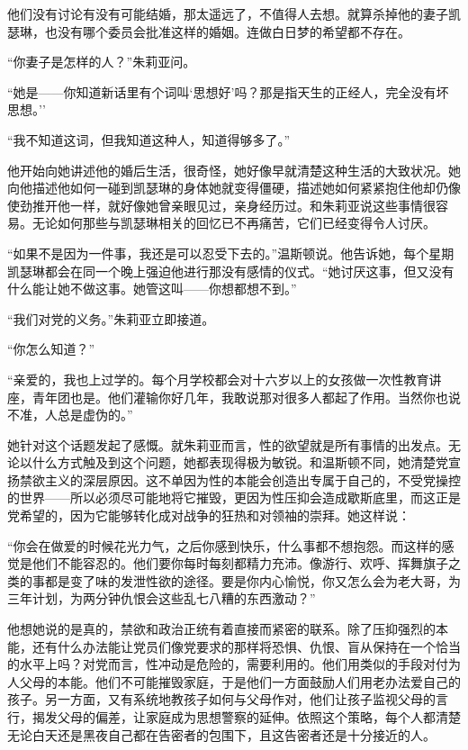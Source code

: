他们没有讨论有没有可能结婚，那太遥远了，不值得人去想。就算杀掉他的妻子凯瑟琳，也没有哪个委员会批准这样的婚姻。连做白日梦的希望都不存在。

``你妻子是怎样的人？''朱莉亚问。

``她是——你知道新话里有个词叫`思想好'吗？那是指天生的正经人，完全没有坏思想。''

``我不知道这词，但我知道这种人，知道得够多了。''

他开始向她讲述他的婚后生活，很奇怪，她好像早就清楚这种生活的大致状况。她向他描述他如何一碰到凯瑟琳的身体她就变得僵硬，描述她如何紧紧抱住他却仍像使劲推开他一样，就好像她曾亲眼见过，亲身经历过。和朱莉亚说这些事情很容易。无论如何那些与凯瑟琳相关的回忆已不再痛苦，它们已经变得令人讨厌。

``如果不是因为一件事，我还是可以忍受下去的。''温斯顿说。他告诉她，每个星期凯瑟琳都会在同一个晚上强迫他进行那没有感情的仪式。``她讨厌这事，但又没有什么能让她不做这事。她管这叫——你想都想不到。''

``我们对党的义务。''朱莉亚立即接道。

``你怎么知道？''

``亲爱的，我也上过学的。每个月学校都会对十六岁以上的女孩做一次性教育讲座，青年团也是。他们灌输你好几年，我敢说那对很多人都起了作用。当然你也说不准，人总是虚伪的。''

她针对这个话题发起了感慨。就朱莉亚而言，性的欲望就是所有事情的出发点。无论以什么方式触及到这个问题，她都表现得极为敏锐。和温斯顿不同，她清楚党宣扬禁欲主义的深层原因。这不单因为性的本能会创造出专属于自己的，不受党操控的世界——所以必须尽可能地将它摧毁，更因为性压抑会造成歇斯底里，而这正是党希望的，因为它能够转化成对战争的狂热和对领袖的崇拜。她这样说：

``你会在做爱的时候花光力气，之后你感到快乐，什么事都不想抱怨。而这样的感觉是他们不能容忍的。他们要你每时每刻都精力充沛。像游行、欢呼、挥舞旗子之类的事都是变了味的发泄性欲的途径。要是你内心愉悦，你又怎么会为老大哥，为三年计划，为两分钟仇恨会这些乱七八糟的东西激动？''

他想她说的是真的，禁欲和政治正统有着直接而紧密的联系。除了压抑强烈的本能，还有什么办法能让党员们像党要求的那样将恐惧、仇恨、盲从保持在一个恰当的水平上吗？对党而言，性冲动是危险的，需要利用的。他们用类似的手段对付为人父母的本能。他们不可能摧毁家庭，于是他们一方面鼓励人们用老办法爱自己的孩子。另一方面，又有系统地教孩子如何与父母作对，他们让孩子监视父母的言行，揭发父母的偏差，让家庭成为思想警察的延伸。依照这个策略，每个人都清楚无论白天还是黑夜自己都在告密者的包围下，且这告密者还是十分接近的人。

